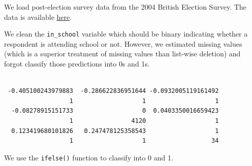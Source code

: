 \documentclass[]{article}
\newenvironment{Shaded}{\begin{snugshade}}{\end{snugshade}}
\newcommand{\CommentTok}[1]{\textcolor[rgb]{0.56,0.35,0.01}{\textit{#1}}}
\newcommand{\DataTypeTok}[1]{\textcolor[rgb]{0.13,0.29,0.53}{#1}}
\newcommand{\DecValTok}[1]{\textcolor[rgb]{0.00,0.00,0.81}{#1}}
\newcommand{\FloatTok}[1]{\textcolor[rgb]{0.00,0.00,0.81}{#1}}
\newcommand{\KeywordTok}[1]{\textcolor[rgb]{0.13,0.29,0.53}{\textbf{#1}}}
\newcommand{\NormalTok}[1]{#1}
\newcommand{\OperatorTok}[1]{\textcolor[rgb]{0.81,0.36,0.00}{\textbf{#1}}}
\newcommand{\OtherTok}[1]{\textcolor[rgb]{0.56,0.35,0.01}{#1}}
\newcommand{\StringTok}[1]{\textcolor[rgb]{0.31,0.60,0.02}{#1}}
\begin{document}
We load post-election survey data from the 2004 British Election Survey. The data is available \href{http://philippbroniecki.github.io/ML2017.io/data/bes.dta}{here}.

\begin{Shaded}
\end{Shaded}

We clean the \texttt{in\_school} variable which should be binary indicating whether a respondent is attending school or not. However, we estimated missing values (which is a superior treatment of missing values than list-wise deletion) and forgot classify those predictions into 0s and 1s.

\begin{Shaded}
\end{Shaded}

\begin{verbatim}

 -0.405100243979883  -0.286622836951644 -0.0932005119161492 
                  1                   1                   1 
  -0.08278915151733                   0  0.0403350016659423 
                  1                4120                   1 
  0.123419680101826   0.247478125358543                   1 
                  1                   1                  34 
\end{verbatim}

We use the \texttt{ifelse()} function to classify into 0 and 1.

\begin{Shaded}
\end{Shaded}
\end{document}
